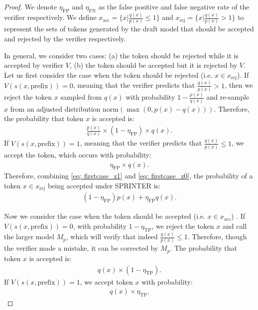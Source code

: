 \documentclass{article}
\theoremstyle{plain}
\theoremstyle{definition}
\theoremstyle{remark}
\begin{document}
\begin{proof}
    We denote $\eta_\text{FP}$ and $\eta_\text{FN}$ as the false positive and false negative rate of the verifier respectively. We define $x_\text{acc} = \{ x | \frac{q(x)}{p(x)}\leq 1 \}$ and $x_\text{rej} = \{ x | \frac{q(x)}{p(x)}>1 \}$ to represent the sets of tokens generated by the draft model that should be accepted and rejected by the verifier respectively.

    In general, we consider two cases: (a) the token should be rejected while it is accepted by verifier $V$, (b) the token should be accepted but it is rejected by $V$. Let us first consider the case when the token should be rejected (i.e. $x \in x_\text{rej}$). If $V(s(x,\text{prefix})) = 0$, meaning that the verifier predicts that ${\frac{q(x)}{p(x)}} > 1$, then we reject the token $x$ sampled from $q(x)$ with probability $1-\frac{p(x)}{q(x)}$ and re-sample $x$ from an adjusted distribution $\text{norm}(\max(0, p(x) - q(x)))$. Therefore, the probability that token $x$ is accepted is:
    \begin{align}
        \frac{p(x)}{q(x)} \times (1-\eta_\text{FP}) \times q(x). \label{eq: firstcase_z1}
    \end{align} If $V(s(x,\text{prefix})) =1$, meaning that the verifier predicts that  ${\frac{q(x)}{p(x)}} \leq 1$, we accept the token, which occurs with probability:
    \begin{align}
        \eta_\text{FP} \times q(x).  \label{eq: firstcase_z0}
    \end{align}
    Therefore,  combining \eqref{eq: firstcase_z1} and \eqref{eq: firstcase_z0}, the probability of a token $x \in x_\text{rej}$ being accepted under SPRINTER is:
    \begin{align}
      (1-\eta_\text{FP}) p(x) + \eta_\text{FP} q(x). \label{eq: theorem1_side1}
    \end{align}

    Now we consider the case when the token should be accepted (i.e. $x\in x_\text{acc}$) . If $V(s(x,\text{prefix})) = 0$, with probability $1-\eta_\text{TP}$, we reject the token $x$ and call the larger model $M_p$, which will verify that indeed $\frac{q(x)}{p(x)} \leq 1$. Therefore, though the verifier made a mistake, it can be corrected by $M_p$. The probability that token $x$ is accepted is:
    \begin{align}
        q(x) \times (1-\eta_\text{TP}). \label{eq: seccase_z1}
    \end{align}
    If $V(s(x,\text{prefix})) = 1$, we accept token $x$ with probability:
    \begin{align}
        q(x) \times \eta_\text{TP}. \label{eq: sec_acc_case_z1}
    \end{align}
    

\end{proof}
\end{document}
